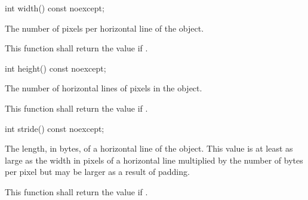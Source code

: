 \begin{itemdecl}
int width() const noexcept;
\end{itemdecl}
\begin{itemdescr}
\pnum
\returns
The number of pixels per horizontal line of the  object.

\pnum
\remarks
This function shall return the value  if .
\end{itemdescr}

\begin{itemdecl}
int height() const noexcept;
\end{itemdecl}
\begin{itemdescr}
\pnum
\returns
The number of horizontal lines of pixels in the  object.

\pnum
\remarks
This function shall return the value  if .
\end{itemdescr}

\begin{itemdecl}
int stride() const noexcept;
\end{itemdecl}
\begin{itemdescr}
\pnum
\returns
The length, in bytes, of a horizontal line of the  object.
\enternote
This value is at least as large as the width in pixels of a horizontal line multiplied by the number of bytes per pixel but may be larger as a result of padding.
\exitnote

\pnum
\remarks
This function shall return the value  if .
\end{itemdescr}
